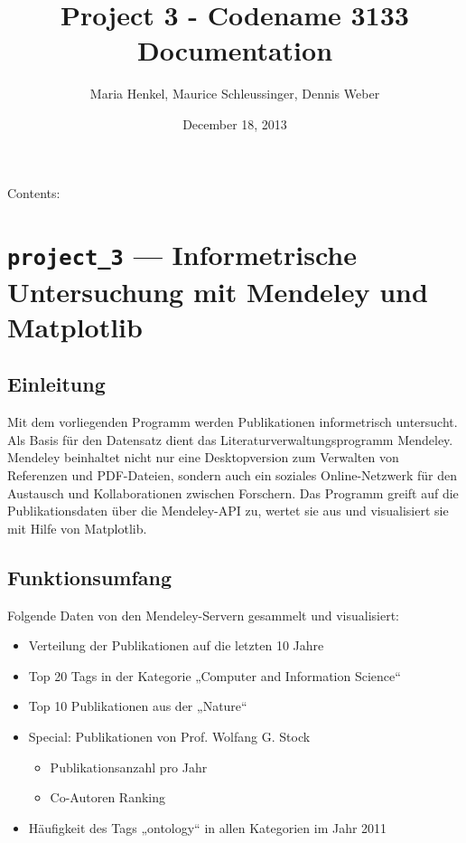 \documentclass[letterpaper,10pt,english]{sphinxmanual}
\title{Project 3 - Codename 3133 Documentation}
\date{December 18, 2013}
\author{Maria Henkel, Maurice Schleussinger, Dennis Weber}
\begin{document}
\maketitle
\tableofcontents
{}\label{index::doc}


Contents:


\chapter{\texttt{project\_3} --- Informetrische Untersuchung mit Mendeley und Matplotlib}
\label{project_3:module-project_3}\label{project_3::doc}\label{project_3:project-3-informetrische-untersuchung-mit-mendeley-und-matplotlib}\label{project_3:welcome-to-project-3-codename-3133-s-documentation}

\section{Einleitung}
\label{project_3:einleitung}
Mit dem vorliegenden Programm werden Publikationen informetrisch untersucht. Als Basis für den Datensatz dient das Literaturverwaltungsprogramm Mendeley. Mendeley beinhaltet nicht nur eine Desktopversion zum Verwalten von Referenzen und PDF-Dateien, sondern auch ein soziales Online-Netzwerk für den Austausch und Kollaborationen zwischen Forschern. Das Programm greift auf die Publikationsdaten über die Mendeley-API zu, wertet sie aus und visualisiert sie mit Hilfe von Matplotlib.


\section{Funktionsumfang}
\label{project_3:funktionsumfang}
Folgende Daten von den Mendeley-Servern gesammelt und visualisiert:
\begin{itemize}
\item {} 
Verteilung der Publikationen auf die letzten 10 Jahre

\item {} 
Top 20 Tags in der Kategorie „Computer and Information Science“

\item {} 
Top 10 Publikationen aus der „Nature“

\item {} 
Special: Publikationen von Prof. Wolfang G. Stock
\begin{itemize}
\item {} 
Publikationsanzahl pro Jahr

\item {} 
Co-Autoren Ranking

\end{itemize}

\item {} 
Häufigkeit des Tags „ontology“ in allen Kategorien im Jahr 2011

\end{itemize}
\end{document}

